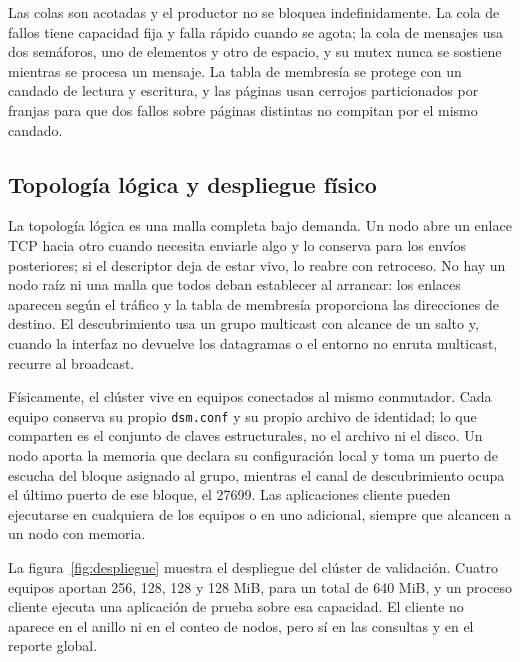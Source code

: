 Las colas son acotadas y el productor no se bloquea indefinidamente. La cola de fallos tiene capacidad fija y falla rápido cuando se agota; la cola de mensajes usa dos semáforos, uno de elementos y otro de espacio, y su mutex nunca se sostiene mientras se procesa un mensaje. La tabla de membresía se protege con un candado de lectura y escritura, y las páginas usan cerrojos particionados por franjas para que dos fallos sobre páginas distintas no compitan por el mismo candado.

\subsection{Topología lógica y despliegue físico}

La topología lógica es una malla completa bajo demanda. Un nodo abre un enlace TCP hacia otro cuando necesita enviarle algo y lo conserva para los envíos posteriores; si el descriptor deja de estar vivo, lo reabre con retroceso. No hay un nodo raíz ni una malla que todos deban establecer al arrancar: los enlaces aparecen según el tráfico y la tabla de membresía proporciona las direcciones de destino. El descubrimiento usa un grupo multicast con alcance de un salto y, cuando la interfaz no devuelve los datagramas o el entorno no enruta multicast, recurre al broadcast.

Físicamente, el clúster vive en equipos conectados al mismo conmutador. Cada equipo conserva su propio \texttt{dsm.conf} y su propio archivo de identidad; lo que comparten es el conjunto de claves estructurales, no el archivo ni el disco. Un nodo aporta la memoria que declara su configuración local y toma un puerto de escucha del bloque asignado al grupo, mientras el canal de descubrimiento ocupa el último puerto de ese bloque, el 27699. Las aplicaciones cliente pueden ejecutarse en cualquiera de los equipos o en uno adicional, siempre que alcancen a un nodo con memoria.

La figura~\ref{fig:despliegue} muestra el despliegue del clúster de validación. Cuatro equipos aportan 256, 128, 128 y 128 MiB, para un total de 640 MiB, y un proceso cliente ejecuta una aplicación de prueba sobre esa capacidad. El cliente no aparece en el anillo ni en el conteo de nodos, pero sí en las consultas y en el reporte global.

